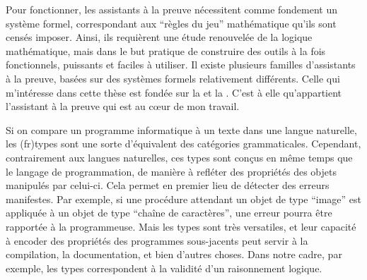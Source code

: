 Pour fonctionner, les assistants à la preuve nécessitent comme fondement un système
formel, correspondant aux “règles du jeu” mathématique qu’ils sont censés imposer.
Ainsi, ils requièrent une étude renouvelée de la logique mathématique, mais dans le but
pratique de construire des outils à la fois fonctionnels,
puissants et faciles à utiliser.
Il existe plusieurs familles d’assistants à la preuve, basées sur des
systèmes formels relativement différents. Celle qui m’intéresse dans cette thèse
est fondée sur la 
et la .
C’est à elle qu’appartient l’assistant à la preuve 
 qui est au cœur de mon travail.

Si on compare un programme informatique à un texte dans une langue naturelle,
les \intro(fr){types} sont une sorte d’équivalent des catégories grammaticales.
Cependant, contrairement aux langues naturelles, ces types sont conçus
en même temps que le langage de programmation,
de manière à refléter des propriétés des objets manipulés par celui-ci.
Cela permet en premier lieu de détecter des erreurs manifestes.
Par exemple, si une procédure attendant un objet de type “image” est
appliquée à un objet de type “chaîne de caractères”, une erreur pourra être rapportée
à la programmeuse.%
Mais les types sont très versatiles, et leur capacité à encoder
des propriétés des programmes sous-jacents peut servir à la compilation, la
documentation, et bien d’autres choses.
Dans notre cadre, par exemple, les types correspondent à la validité d’un raisonnement logique.

